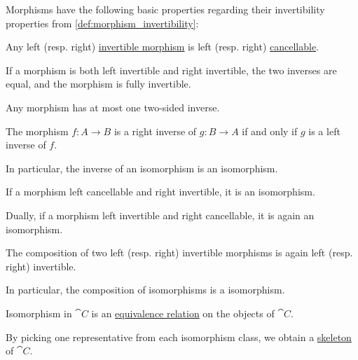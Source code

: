 \begin{proposition}\label{thm:def:morphism_invertibility}
  Morphisms have the following basic properties regarding their invertibility properties from \cref{def:morphism_invertibility}:
  \begin{thmenum}
     Any left (resp. right) \hyperref[def:morphism_invertibility]{invertible morphism} is left (resp. right) \hyperref[def:morphism_cancellation]{cancellable}.

     If a morphism is both left invertible and right invertible, the two inverses are equal, and the morphism is fully invertible.

     Any morphism has at most one two-sided inverse.

     The morphism \( f: A \to B \) is a right inverse of \( g: B \to A \) if and only if \( g \) is a left inverse of \( f \).

    In particular, the inverse of an isomorphism is an isomorphism.

     If a morphism left cancellable and right invertible, it is an isomorphism.

    Dually, if a morphism left invertible and right cancellable, it is again an isomorphism.

     The composition of two left (resp. right) invertible morphisms is again left (resp. right) invertible.

    In particular, the composition of isomorphisms is a isomorphism.

     Isomorphism in \( \cat{C} \) is an \hyperref[def:equivalence_relation]{equivalence relation} on the objects of \( \cat{C} \).

    By picking one representative from each isomorphism class, we obtain a \hyperref[def:category_skeleton]{skeleton} of \( \cat{C} \).
  \end{thmenum}
\end{proposition}
